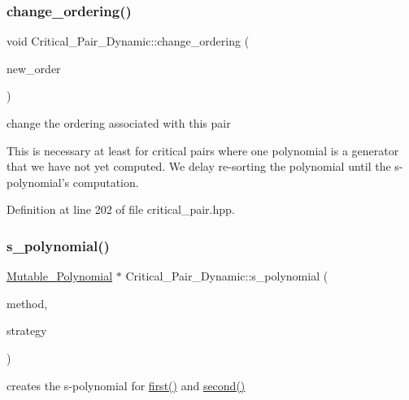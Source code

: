 \subsubsection{\texorpdfstring{change\+\_\+ordering()}{change\_ordering()}}
{\footnotesize\ttfamily void Critical\+\_\+\+Pair\+\_\+\+Dynamic\+::change\+\_\+ordering (\begin{DoxyParamCaption}\item[{\hyperlink{class_weighted___ordering}{Weighted\+\_\+\+Ordering} $\ast$}]{new\+\_\+order }\end{DoxyParamCaption})\hspace{0.3cm}{\ttfamily [inline]}}



change the ordering associated with this pair 

This is necessary at least for critical pairs where one polynomial is a generator that we have not yet computed. We delay re-\/sorting the polynomial until the s-\/polynomial's computation. 

Definition at line 202 of file critical\+\_\+pair.\+hpp.

\mbox{\label{class_critical___pair___dynamic_acaeda6e006f9d9785e28fa5b6bbf49e9}} 
\subsubsection{\texorpdfstring{s\+\_\+polynomial()}{s\_polynomial()}}
{\footnotesize\ttfamily \hyperlink{class_mutable___polynomial}{Mutable\+\_\+\+Polynomial} $\ast$ Critical\+\_\+\+Pair\+\_\+\+Dynamic\+::s\+\_\+polynomial (\begin{DoxyParamCaption}\item[{\hyperlink{group___g_b_computation_ga73257b8a2d5cc826853a71b77d0cebf2}{S\+Poly\+Creation\+Flags}}]{method,  }\item[{int}]{strategy }\end{DoxyParamCaption})\hspace{0.3cm}{\ttfamily [virtual]}}



creates the s-\/polynomial for \hyperlink{class_critical___pair___basic_a6e251e3724fde2c610d921f93889eb67}{first()} and \hyperlink{class_critical___pair___basic_a06da1cbbe1451962b68f2bbf90855fae}{second()} 

